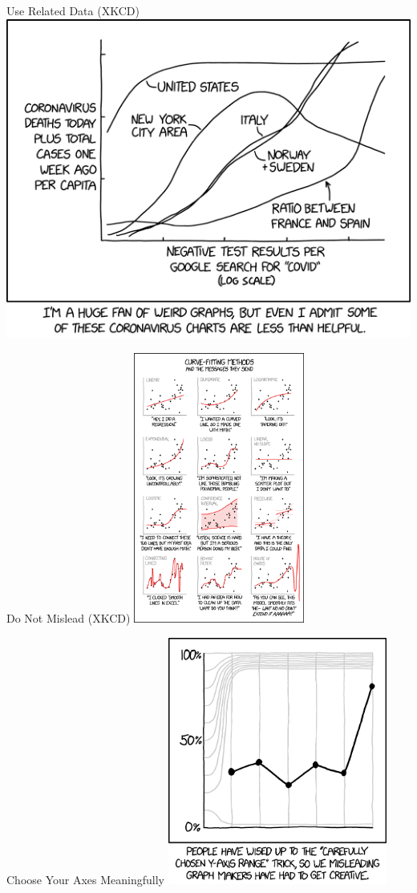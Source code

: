 \documentclass[ignorenonframetext,xcolor=x11names]{beamer}
\begin{document}
\begin{frame}{Use Related Data (XKCD)}
  \includegraphics[width=\textwidth]{xkcd_coronavirus_charts.png}
\end{frame}

\begin{frame}{Do Not Mislead (XKCD)}
\centering
  \includegraphics[height=3.5in]{xkcd_curve_fitting.png}
\end{frame}

\begin{frame}{Choose Your Axes Meaningfully}
\centering
  \includegraphics[height=3.2in]{xkcd_y_axis_2x.png}
\end{frame}
\end{document}
